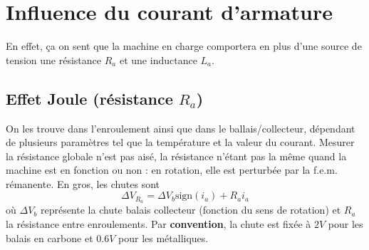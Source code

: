 			
\section{Influence du courant d'armature}
En effet, ça on sent que la machine en charge comportera en plus d'une 
source de tension une résistance $R_a$ et une inductance $L_a$.

	\subsection{Effet Joule (résistance $R_a$)}
	On les trouve dans l'enroulement ainsi que dans le ballais/collecteur,
	dépendant de plusieurs paramètres tel que la température et la valeur du courant.
	Mesurer la résistance globale n'est pas aisé, la résistance n'étant 
	pas la même quand la machine est en fonction ou non : en rotation, 
	elle est perturbée par la f.e.m. rémanente. En gros, les chutes sont 
	\begin{equation}
	\Delta V_{R_a} = \Delta V_b\text{sign}(i_a) + R_ai_a
	\end{equation}
	où $\Delta V_b$ représente la chute balais collecteur (fonction du 
	sens de rotation) et $R_a$ la résistance entre enroulements. Par 
	\textbf{convention}, la chute est fixée à $2V$ pour les balais en 
	carbone et $0.6V$ pour les métalliques.
	
